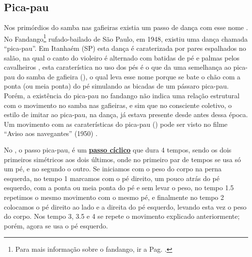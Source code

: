 \subsection{Pica-pau} 

Nos primórdios do samba nas gafieiras existia um passo de dança com esse nome \cite[pp. 142]{perna2002samba}.
No Fandango\footnote{Para mais informação sobre o fandango, ir a Pag. \pageref{fig:fandango}.} 
rufado-bailado de São Paulo, em 1948, existiu uma dança chamada ``pica-pau''.
Em Itanhaém (SP) esta dança é caraterizada por pares espalhados no salão,
na qual o canto do violeiro é alternado com batidas de pé e palmas pelos 
cavalheiros \cite[pp. 607-608]{marcondes1977enciclopediav2} \cite[pp. 49]{fandangoSP},
esta caraterística no uso dos pés é o que da uma semelhança ao pica-pau do samba de gafieira (\AnoLivro),
o qual leva esse nome porque se bate o chão com a ponta (ou meia ponta) do pé simulando as bicadas de um pássaro pica-pau.
Porém, a existência do pica-pau no fandango não indica uma relação estrutural com o movimento no samba nas gafieiras,
e sim que no consciente coletivo, o estilo de imitar ao pica-pau, na dança,
já estava presente desde antes dessa época.
Um movimento com as caraterísticas do pica-pau (\AnoLivro) pode ser visto 
no filme ``Aviso aos navegantes'' (1950) \cite[min. 40:35]{AtlantidaDance}.


No \AnoLivro, o passo pica-pau, é um \hyperref[def:PassoCiclico]{\textbf{passo cíclico}} que dura 4 tempos, 
sendo os dois primeiros simétricos aos dois últimos, 
onde no primeiro par de tempos se usa só um pé,
e no segundo o outro.
Se iniciamos com o peso do corpo na perna esquerda, 
no tempo 1 marcamos com o pé direito, um pouco atrás do pé esquerdo, 
com a ponta ou meia ponta do pé e sem levar o peso,
no tempo 1.5 repetimos o mesmo movimento com o mesmo pé, e finalmente
no tempo 2 colocamos o pé direito ao lado e a direita do pé esquerdo, 
levando esta vez o peso do corpo. 
Nos tempo 3, 3.5 e 4 se repete o movimento explicado anteriormente; porém,
agora se usa o pé esquerdo.
  
